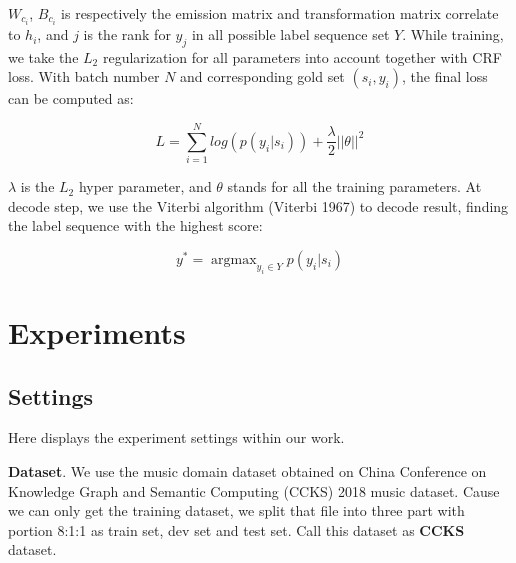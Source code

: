 \documentclass[letterpaper]{article} %
\begin{document}
$W_{c_i}$, $B_{c_i}$ is respectively the emission matrix and transformation matrix correlate to $h_i$, and $j$ is the rank for $y_j$ in all possible label sequence set $Y$.  While training, we take the $L_2$ regularization for all parameters into account together with CRF loss. With batch number $N$ and corresponding gold set $(s_i, y_i)$, the final loss can be computed as:

\begin{equation}
L = \sum_{i=1}^{N}{log(p(y_i | s_i))} + \frac{\lambda}{2}{|| \theta ||}^2
\label{crf_probability}
\end{equation}

$\lambda$ is the $L_2$ hyper parameter, and $\theta$ stands for all the training parameters. At decode step, we use the Viterbi algorithm (Viterbi 1967) to decode result, finding the label sequence with the highest score: 

\begin{equation}
y^* = \mathop{\arg\max}_{y_i \in Y}{p(y_i | s_i)}
\label{crf_decode}
\end{equation}

\section{Experiments}

\subsection{Settings}

Here displays the experiment settings within our work.

\textbf{Dataset}. We use the music domain dataset obtained on China Conference on Knowledge Graph and Semantic Computing (CCKS) 2018 music dataset. Cause we can only get the training dataset,  we split that file into three part with portion 8:1:1 as train set, dev set and test set. Call this dataset as \textbf{CCKS} dataset. 

\begin{table}[t]
\caption{Statistics of Sogou MusicNER dataset.}\smallskip
\centering
{}
\label{table1}
\end{table}
\end{document}
